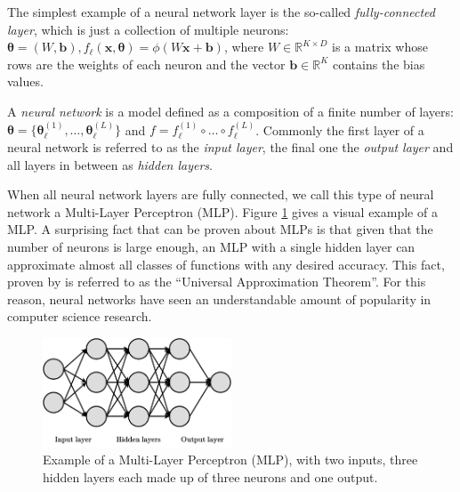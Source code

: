 The simplest example of a neural network layer is the so-called \emph{fully-connected layer}, which is just a collection of multiple neurons: $\pmb{\theta}=(W, \pmb{b}), f_{\ell}(\pmb{x}, \pmb{\theta}) = \phi\left(W\pmb{x} + \pmb{b}\right)$, where $W \in \mathbb{R}^{K \times D}$ is a matrix whose rows are the weights of each neuron and the vector $\pmb{b} \in \mathbb{R}^K$ contains the bias values.

\begin{definition}
A \emph{neural network} is a model defined as a composition of a finite number of layers: $\pmb{\theta}=\{\pmb{\theta}_{\ell}^{(1)},\dots,\pmb{\theta}_{\ell}^{(L)}\}$ and $f = f_{\ell}^{(1)} \circ \dots \circ f_{\ell}^{(L)}$. Commonly the first layer of a neural network is referred to as the \emph{input layer}, the final one the \emph{output layer} and all layers in between as \emph{hidden layers}. 
\end{definition}

When all neural network layers are fully connected, we call this type of neural network a Multi-Layer Perceptron (MLP). Figure \ref{fig:mlp_example} gives a visual example of a MLP. A surprising fact that can be proven about MLPs is that given that the number of neurons is large enough, an MLP with a single hidden layer can approximate almost all classes of functions with any desired accuracy. This fact, proven by \cite{hornik_multilayer_1989} is referred to as the \enquote{Universal Approximation Theorem}. For this reason, neural networks have seen an understandable amount of popularity in computer science research.

\begin{figure}[H]
\centering
\includegraphics[width=0.5\textwidth]{figures/background/mlp_example}
\caption[Example of a Multi-Layer Perceptron (MLP).]{Example of a Multi-Layer Perceptron (MLP), with two inputs, three hidden layers each made up of three neurons and one output.}
\label{fig:mlp_example}
\end{figure}

